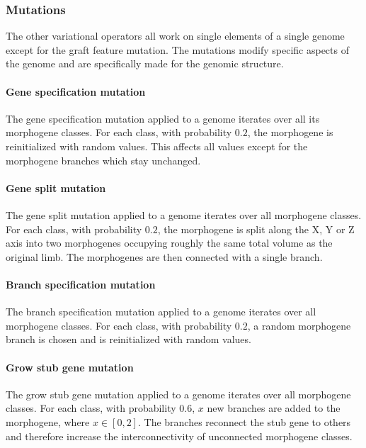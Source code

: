 \documentclass[main]{subfiles}
\begin{document}
\subsubsection{Mutations}

The other variational operators all work on single elements of a single genome except for the graft feature mutation. The mutations modify specific aspects of the genome and are specifically made for the genomic structure.

\paragraph{Gene specification mutation}

The gene specification mutation applied to a genome iterates over all its morphogene classes. For each class, with probability $0.2$, the morphogene is reinitialized with random values. This affects all values except for the morphogene branches which stay unchanged.

\paragraph{Gene split mutation}

The gene split mutation applied to a genome iterates over all morphogene classes. For each class, with probability $0.2$, the morphogene is split along the X, Y or Z axis into two morphogenes occupying roughly the same total volume as the original limb. The morphogenes are then connected with a single branch.

\paragraph{Branch specification mutation}

The branch specification mutation applied to a genome iterates over all morphogene classes. For each class, with probability $0.2$, a random morphogene branch is chosen and is reinitialized with random values. 

\paragraph{Grow stub gene mutation}

The grow stub gene mutation applied to a genome iterates over all morphogene classes. For each class, with probability $0.6$, $x$ new branches are added to the morphogene, where $x \in [0,2]$. The branches reconnect the stub gene to others and therefore increase the interconnectivity of unconnected morphogene classes.
\end{document}
